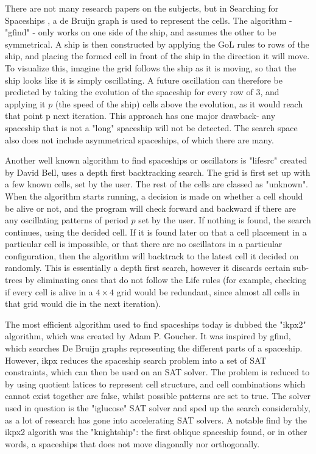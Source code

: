 \documentclass{l4proj}
\begin{document}
There are not many research papers on the subjects, but in Searching for Spaceships \citep{searching_for_spaceships}, a de Bruijn graph is used to represent the cells. The algorithm - "gfind" - only works on one side of the ship, and assumes the other to be symmetrical. A ship is then constructed by applying the GoL rules to rows of the ship, and placing the formed cell in front of the ship in the direction it will move. To visualize this, imagine the grid follows the ship as it is moving, so that the ship looks like it is simply oscillating. A future oscillation can therefore be predicted by taking the evolution of the spaceship for every row of 3, and applying it $p$ (the speed of the ship) cells above the evolution, as it would reach that point p next iteration. This approach has one major drawback- any spaceship that is not a "long" spaceship will not be detected. The search space also does not include asymmetrical spaceships, of which there are many.

Another well known algorithm to find spaceships or oscillators is "lifesrc" created by David Bell, uses a depth first backtracking search. The grid is first set up with a few known cells, set by the user. The rest of the cells are classed as "unknown". When the algorithm starts running, a decision is made on whether a cell should be alive or not, and the program will check forward and backward if there are any oscillating patterns of period $p$ set by the user. If nothing is found, the search continues, using the decided cell. If it is found later on that a cell placement in a particular cell is impossible, or that there are no oscillators in a particular configuration, then the algorithm will backtrack to the latest cell it decided on randomly. This is essentially a depth first search, however it discards certain sub-trees by eliminating ones that do not follow the Life rules (for example, checking if every cell is alive in a $4 \times 4$ grid would be redundant, since almost all cells in that grid would die in the next iteration). 

The most efficient algorithm used to find spaceships today is dubbed the "ikpx2" algorithm, which was created by Adam P. Goucher. It was inspired by gfind, which searches De Bruijn graphs representing the different parts of a spaceship. However, ikpx reduces the spaceship search problem into a set of SAT constraints, which can then be used on an SAT solver. The problem is reduced to by using quotient latices to represent cell structure, and cell combinations which cannot exist together are false, whilst possible patterns are set to true. The solver used in question is the "iglucose" \citep{sat_2018} SAT solver and sped up the search considerably, as a lot of research has gone into accelerating SAT solvers. A notable find by the ikpx2 algorith was the "knightship": the first oblique spaceship found, or in other words, a spaceships that does not move diagonally nor orthogonally.
\end{document}
